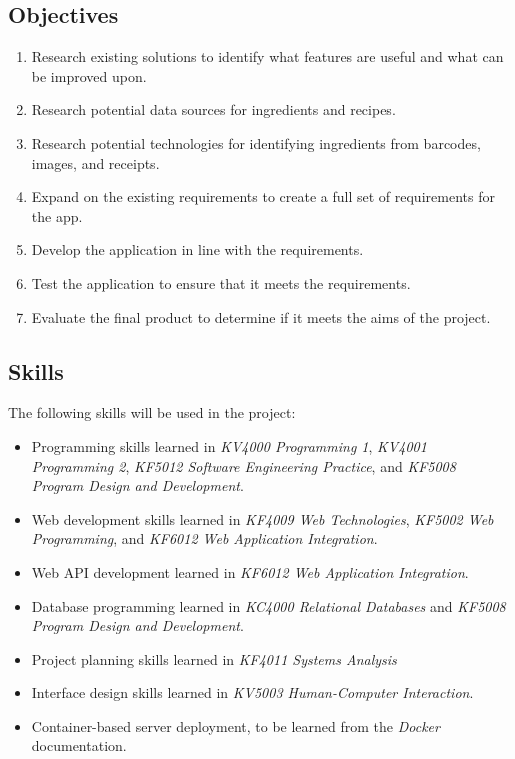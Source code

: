 \documentclass[../CHEFCookingHelperForEveryonesFridge.tex]{subfiles}
\begin{document}
\subsection{Objectives}

\begin{enumerate}
    \item Research existing solutions to identify what features are useful and what can be improved upon.
    \item Research potential data sources for ingredients and recipes.
    \item Research potential technologies for identifying ingredients from barcodes, images, and receipts.
    \item Expand on the existing requirements to create a full set of requirements for the \chef{} app.
    \item Develop the \chef{} application in line with the requirements.
    \item Test the \chef{} application to ensure that it meets the requirements.
    \item Evaluate the final product to determine if it meets the aims of the project.
\end{enumerate}

\subsection{Skills}
The following skills will be used in the project:

\begin{itemize}
    \item Programming skills learned in \textit{KV4000 Programming 1}, \textit{KV4001 Programming 2},
          \textit{KF5012 Software Engineering Practice}, and \textit{KF5008 Program Design and Development}.
    \item Web development skills learned in \textit{KF4009 Web Technologies}, \textit{KF5002 Web Programming},
          and \textit{KF6012 Web Application Integration}.
    \item Web API development learned in \textit{KF6012 Web Application Integration}.
    \item Database programming learned in \textit{KC4000 Relational Databases} and \textit{KF5008 Program Design and Development}.
    \item Project planning skills learned in \textit{KF4011 Systems Analysis}
    \item Interface design skills learned in \textit{KV5003 Human-Computer Interaction}.
    \item Container-based server deployment, to be learned from the \textit{Docker} documentation.
\end{itemize}
\end{document}
